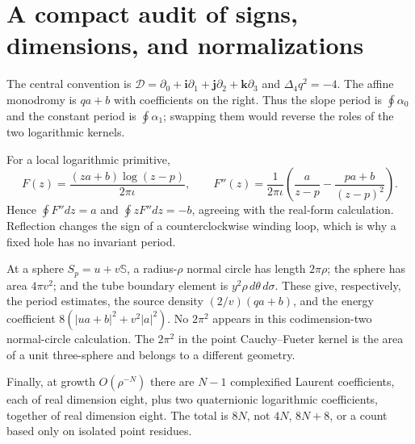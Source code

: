 \documentclass[11pt,a4paper]{article}
\numberwithin{equation}{section}
\theoremstyle{definition}
\theoremstyle{remark}
\newcommand{\SSS}{\mathbb S}
\newcommand{\cD}{\mathcal D}
\newcommand{\lap}{\Delta_4}
\newcommand{\ii}{\mathbf i}
\newcommand{\jj}{\mathbf j}
\newcommand{\kk}{\mathbf k}
\begin{document}
\appendix
\section{A compact audit of signs, dimensions, and normalizations}
\label{app:audit}
The central convention is $\cD=\partial_0+\ii\partial_1+\jj\partial_2+
\kk\partial_3$ and $\lap q^2=-4$. The affine monodromy is $qa+b$ with
coefficients on the right. Thus the slope period is $\oint\alpha_0$ and the
constant period is $\oint\alpha_1$; swapping them would reverse the roles of
the two logarithmic kernels.

For a local logarithmic primitive,
\[
 F(z)=\frac{(za+b)\log(z-p)}{2\pi\iota},\qquad
 F''(z)=\frac1{2\pi\iota}
   \left(\frac a{z-p}-\frac{pa+b}{(z-p)^2}\right).
\]
Hence $\oint F''dz=a$ and $\oint zF''dz=-b$, agreeing with the real-form
calculation. Reflection changes the sign of a counterclockwise winding loop,
which is why a fixed hole has no invariant period.

At a sphere $S_p=u+v\SSS$, a radius-$\rho$ normal circle has length $2\pi\rho$;
the sphere has area $4\pi v^2$; and the tube boundary element is
$y^2\rho\,d\theta\,d\sigma$. These give, respectively, the period estimates,
the source density $(2/v)(qa+b)$, and the energy coefficient
$8(|ua+b|^2+v^2|a|^2)$. No $2\pi^2$ appears in this codimension-two normal-circle
calculation. The $2\pi^2$ in the point Cauchy--Fueter kernel is the area of a
unit three-sphere and belongs to a different geometry.

Finally, at growth $O(\rho^{-N})$ there are $N-1$ complexified Laurent
coefficients, each of real dimension eight, plus two quaternionic logarithmic
coefficients, together of real dimension eight. The total is $8N$, not
$4N$, $8N+8$, or a count based only on isolated point residues.
\end{document}
